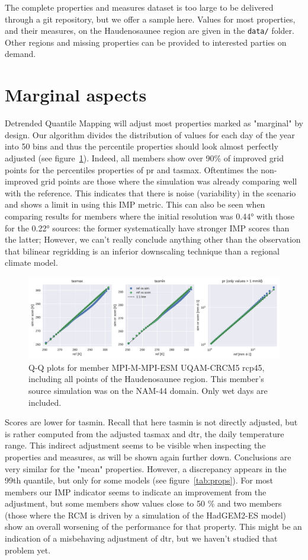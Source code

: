 \documentclass[letterpaper,10pt]{article}
\begin{document}
The complete properties and measures dataset is too large to be delivered through a git repository, but we offer a sample here.
Values for most properties, and their measures, on the Haudenosaunee region are given in the \texttt{data/} folder.
Other regions and missing properties can be provided to interested parties on demand.

\section{Marginal aspects}\label{sec:marg}
Detrended Quantile Mapping will adjust most properties marked as "marginal" by design.
Our algorithm divides the distribution of values for each day of the year into 50 bins and thus the percentile properties should look almost perfectly adjusted (see figure~\ref{fig:qq}).
Indeed, all members show over 90\% of improved grid points for the percentiles properties of pr and tasmax.
Oftentimes the non-improved grid points are those where the simulation was already comparing well with the reference.
This indicates that there is noise (variability) in the scenario and shows a limit in using this IMP metric.
This can also be seen when comparing results for members where the initial resolution was 0.44° with those for the 0.22° sources: the former systematically have stronger IMP scores than the latter;
However, we can't really conclude anything other than the observation that bilinear regridding is an inferior downscaling technique than a regional climate model.

\begin{figure}
\centering
\includegraphics[width=\textwidth]{../images/QQplots.pdf}
\caption{Q-Q plots for member MPI-M-MPI-ESM UQAM-CRCM5 rcp45, including all points of the Haudenosaunee region. This member's source simulation was on the NAM-44 domain. Only wet days are included.}\label{fig:qq}
\end{figure}

Scores are lower for tasmin. Recall that here tasmin is not directly adjusted, but is rather computed from the adjusted tasmax and dtr, the daily temperature range.
This indirect adjustment seems to be visible when inspecting the properties and measures, as will be shown again further down.
Conclusions are very similar for the "mean" properties.
However, a discrepancy appears in the 99th quantile, but only for some models (see figure~\ref{tab:props}).
For most members our IMP indicator seems to indicate an improvement from the adjustment, but some members show values close to 50 \% and two members (those where the RCM is driven by a simulation of the HadGEM2-ES model) show an overall worsening of the performance for that property.
This might be an indication of a misbehaving adjustment of dtr, but we haven't studied that problem yet.
\end{document}
